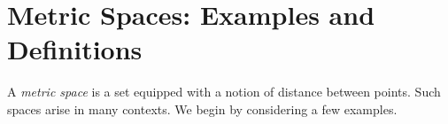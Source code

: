 \section{Metric Spaces: Examples and Definitions}

A \emph{metric space} is a set equipped with a notion of distance between points. Such
spaces arise in many contexts. We begin by considering a few examples.